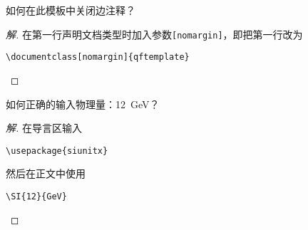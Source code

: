 \documentclass{qftemplate}
\begin{document}
\begin{question}[关闭边注释]
    如何在此模板中关闭边注释？
\end{question}
\begin{proof}[解]
    在第一行声明文档类型时加入参数{\tt [nomargin]}，即把第一行改为
\begin{verbatim}
\documentclass[nomargin]{qftemplate}
\end{verbatim}
\end{proof}

\begin{question}[输入单位]
如何正确的输入物理量：\SI{12}{GeV}？
\end{question}
\begin{proof}[解]
    在导言区输入
\begin{verbatim}
\usepackage{siunitx}
\end{verbatim}
然后在正文中使用
\begin{verbatim}
\SI{12}{GeV}
\end{verbatim}
\end{proof}
\end{document}
